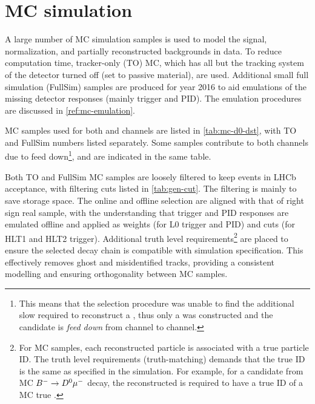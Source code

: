 \section{MC simulation}
\label{ref:sel:mc}

A large number of MC simulation samples is used to
model the signal, normalization, and partially reconstructed backgrounds in
data.
To reduce computation time, tracker-only (TO) MC, which has all but the tracking
system of the detector turned off (set to passive material), are used.
Additional small full simulation (FullSim) samples are produced for year 2016 to
aid emulations of the missing detector responses (mainly trigger and PID).
The emulation procedures are discussed in \cref{ref:mc-emulation}.

MC samples used for both \Dz and \Dstar channels are listed in
\cref{tab:mc-d0-dst}, with TO and FullSim numbers listed separately.
Some samples contribute to both channels due to feed down\footnote{
    This means that the selection procedure was unable to find the
    additional slow \pion required to reconstruct a \Dstar, thus only a
    \Dz was constructed and the candidate is \emph{feed down} from \Dstar
    channel to \Dz channel.
}, and are indicated in the same table.

Both TO and FullSim MC samples are loosely filtered to keep events in LHCb
acceptance, with filtering cuts listed in \cref{tab:gen-cut}.
The filtering is mainly to save storage space.
The online and offline selection are aligned with that of right sign real \muon
sample,
with the understanding that trigger and PID responses are emulated offline and
applied as weights (for L0 trigger and PID) and cuts
(for HLT1 and HLT2 trigger).
Additional truth level requirements\footnote{
    For MC samples, each reconstructed particle is associated with a true
    particle ID. The truth level requirements (truth-matching) demands that
    the true ID is the same as specified in the simulation.
    For example, for a candidate from  MC ${{{B}^-}} \rightarrow {\ensuremath{{D}^0}}{\ensuremath{\mu^-}}$ decay,
    the reconstructed \mu is required to have a true ID of a MC true \mu.
} are placed to ensure the selected decay
chain is compatible with simulation specification.
This effectively removes ghost and misidentified tracks, providing a consistent
modelling and ensuring orthogonality between MC samples.


